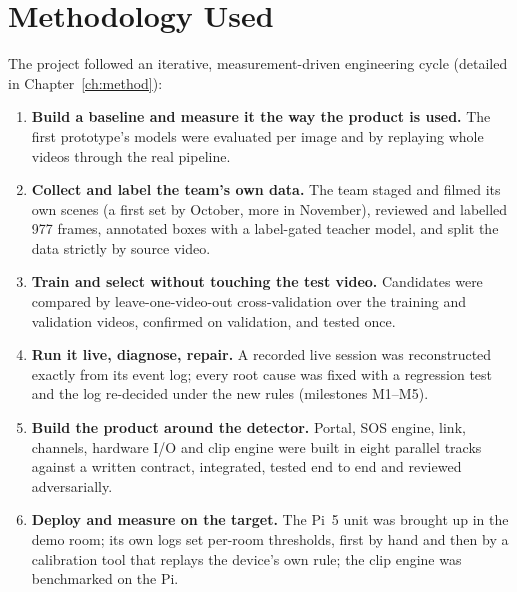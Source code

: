 \section{Methodology Used}
\label{sec:method-summary}
The project followed an iterative, measurement-driven engineering cycle (detailed in Chapter~\ref{ch:method}):
\begin{enumerate}
\item \textbf{Build a baseline and measure it the way the product is used.} The first prototype's models were evaluated per image and by replaying whole videos through the real pipeline.
\item \textbf{Collect and label the team's own data.} The team staged and filmed its own scenes (a first set by October, more in November), reviewed and labelled 977 frames, annotated boxes with a label-gated teacher model, and split the data strictly by source video.
\item \textbf{Train and select without touching the test video.} Candidates were compared by leave-one-video-out cross-validation over the training and validation videos, confirmed on validation, and tested once.
\item \textbf{Run it live, diagnose, repair.} A recorded live session was reconstructed exactly from its event log; every root cause was fixed with a regression test and the log re-decided under the new rules (milestones M1--M5).
\item \textbf{Build the product around the detector.} Portal, SOS engine, link, channels, hardware I/O and clip engine were built in eight parallel tracks against a written contract, integrated, tested end to end and reviewed adversarially.
\item \textbf{Deploy and measure on the target.} The Pi~5 unit was brought up in the demo room; its own logs set per-room thresholds, first by hand and then by a calibration tool that replays the device's own rule; the clip engine was benchmarked on the Pi.
\end{enumerate}


